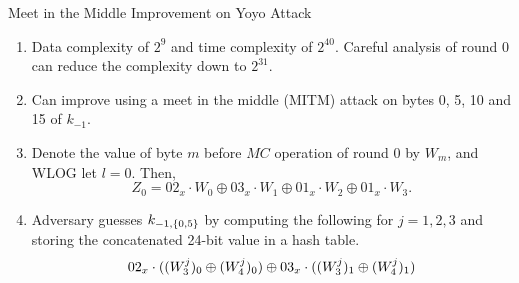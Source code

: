\documentclass[notheorems]{beamer}
\theoremstyle{definition}
\theoremstyle{example}
\begin{document}
    \begin{frame}[<+->]{Meet in the Middle Improvement on Yoyo Attack}
        \begin{enumerate}
            \item Data complexity of \(2^9\) and time complexity of \(2^{40}\).
            Careful analysis of round 0 can reduce the complexity down to
            \(2^{31}\).
            \item Can improve using a meet in the middle (MITM) attack on bytes
            0, 5, 10 and 15 of \(k_{-1}\).
            \item Denote the value of byte \(m\) before \(MC\) operation of
            round 0 by \(W_m\), and WLOG let \(l = 0\). Then,
            \begin{equation}
                Z_0 = 02_x \cdot W_0 \oplus 03_x \cdot W_1 \oplus 01_x \cdot W_2 \oplus 01_x \cdot W_3.
                \label{eq:mitm}
            \end{equation}
            \item Adversary guesses \(k_{-1, \{0, 5\}}\) by computing the
            following for \(j = 1, 2, 3\) and storing the concatenated 24-bit
            value in a hash table.
            \begin{equation}
                02_x \cdot ((W_3^j)_0 \oplus (W_4^j)_0) \oplus 03_x \cdot ((W_3^j)_1 \oplus (W_4^j)_1)
                \label{eq:mitm-0-5}
            \end{equation}
            \seti
        \end{enumerate} 
    \end{frame}
\end{document}
